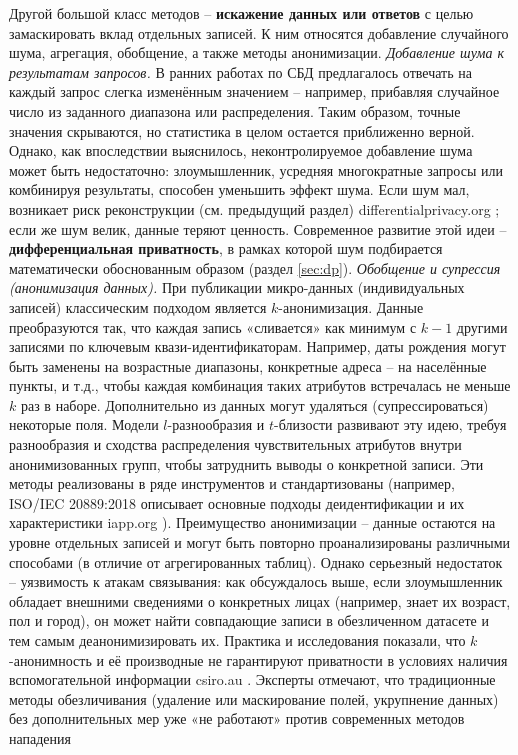 Другой большой класс методов – \textbf{искажение данных или ответов} с целью замаскировать вклад отдельных записей. К ним относятся добавление случайного шума, агрегация, обобщение, а также методы анонимизации. \textit{Добавление шума к результатам запросов.} В ранних работах по СБД предлагалось отвечать на каждый запрос слегка изменённым значением – например, прибавляя случайное число из заданного диапазона или распределения. Таким образом, точные значения скрываются, но статистика в целом остается приближенно верной. Однако, как впоследствии выяснилось, неконтролируемое добавление шума может быть недостаточно: злоумышленник, усредняя многократные запросы или комбинируя результаты, способен уменьшить эффект шума. Если шум мал, возникает риск реконструкции (см. предыдущий раздел)
differentialprivacy.org
; если же шум велик, данные теряют ценность. Современное развитие этой идеи – \textbf{дифференциальная приватность}, в рамках которой шум подбирается математически обоснованным образом (раздел \ref{sec:dp}). \textit{Обобщение и супрессия (анонимизация данных).} При публикации микро-данных (индивидуальных записей) классическим подходом является $k$-анонимизация. Данные преобразуются так, что каждая запись «сливается» как минимум с $k-1$ другими записями по ключевым квази-идентификаторам. Например, даты рождения могут быть заменены на возрастные диапазоны, конкретные адреса – на населённые пункты, и т.д., чтобы каждая комбинация таких атрибутов встречалась не меньше $k$ раз в наборе. Дополнительно из данных могут удаляться (супрессироваться) некоторые поля. Модели $l$-разнообразия и $t$-близости развивают эту идею, требуя разнообразия и сходства распределения чувствительных атрибутов внутри анонимизованных групп, чтобы затруднить выводы о конкретной записи. Эти методы реализованы в ряде инструментов и стандартизованы (например, ISO/IEC 20889:2018 описывает основные подходы деидентификации и их характеристики
iapp.org
). Преимущество анонимизации – данные остаются на уровне отдельных записей и могут быть повторно проанализированы различными способами (в отличие от агрегированных таблиц). Однако серьезный недостаток – уязвимость к атакам связывания: как обсуждалось выше, если злоумышленник обладает внешними сведениями о конкретных лицах (например, знает их возраст, пол и город), он может найти совпадающие записи в обезличенном датасете и тем самым деанонимизировать их. Практика и исследования показали, что $k$-анонимность и её производные не гарантируют приватности в условиях наличия вспомогательной информации
csiro.au
. Эксперты отмечают, что традиционные методы обезличивания (удаление или маскирование полей, укрупнение данных) без дополнительных мер уже «не работают» против современных методов нападения
